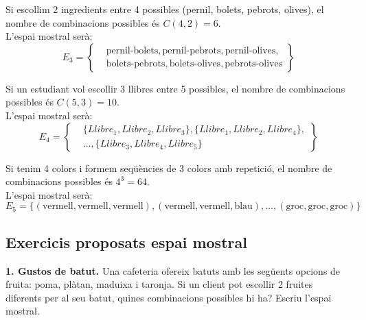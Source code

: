 \documentclass[12pt]{article}
\begin{document}
\begin{exemple}[title=Elecció d'una pizza] \noindent Si escollim 2 ingredients entre 4 possibles (pernil, bolets, pebrots, olives), el nombre de combinacions possibles és $C(4, 2) = 6$. \\

L'espai mostral serà:
\[
E_3 = \left\{
\begin{aligned}
    &\text{pernil-bolets}, \text{pernil-pebrots}, \text{pernil-olives}, \\
    &\text{bolets-pebrots}, \text{bolets-olives}, \text{pebrots-olives}
\end{aligned}
\right\}
\]

\end{exemple}

\begin{exemple}[title=Selecció de llibres] \noindent Si un estudiant vol escollir 3 llibres entre 5 possibles, el nombre de combinacions possibles és $C(5, 3) = 10$. \\

L'espai mostral serà:
\[
E_4 = \left\{
\begin{aligned}
    &\{Llibre_1, Llibre_2, Llibre_3\}, \{Llibre_1, Llibre_2, Llibre_4\}, \\
    &\dots, \{Llibre_3, Llibre_4, Llibre_5\}
\end{aligned}
\right\}
\]

\end{exemple}

\begin{exemple}[title=Codi de colors] \noindent Si tenim 4 colors i formem seqüències de 3 colors amb repetició, el nombre de combinacions possibles és $4^3 = 64$. \\

L'espai mostral serà:
\[
E_5 = \{(\text{vermell}, \text{vermell}, \text{vermell}), (\text{vermell}, \text{vermell}, \text{blau}), \dots, (\text{groc}, \text{groc}, \text{groc})\}
\]
\end{exemple}

\subsection*{Exercicis proposats espai mostral}

\begin{exercici} \noindent 
\textbf{1. Gustos de batut.} Una cafeteria ofereix batuts amb les següents opcions de fruita: poma, plàtan, maduixa i taronja. Si un client pot escollir 2 fruites diferents per al seu batut, quines combinacions possibles hi ha? Escriu l'espai mostral.
\end{exercici}
\end{document}
